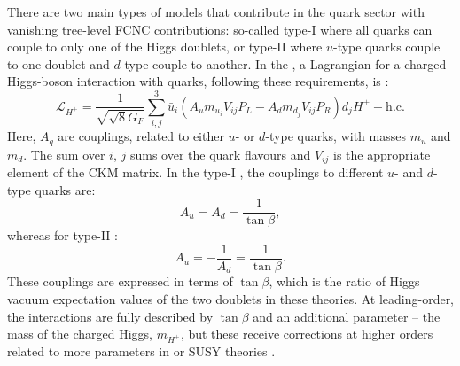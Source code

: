 There are two main types of \TwoHDM models that contribute in the quark sector with vanishing tree-level FCNC contributions:
so-called type-I \TwoHDM where all quarks can couple to only one of the Higgs doublets, or
type-II \TwoHDM where $u$-type quarks couple to one doublet and $d$-type couple to another.
In the \SM, a Lagrangian for a charged Higgs-boson interaction with quarks, following these requirements, is \cite{Hermann:2012fc}:
\begin{equation}
    \mathcal{L}_{H^+} = \frac{1}{\sqrt{\sqrt8G_F}} \sum_{i,j}^3 \bar{u}_i (A_u m_{u_i}V_{ij}P_L - A_d m_{d_j}V_{ij}P_R)d_jH^+ + \mathrm{h.c}.
\end{equation}
Here, $A_q$ are couplings, related to either $u$- or $d$-type quarks, with masses $m_u$ and $m_d$.
The sum over $i$, $j$ sums over the quark flavours and $V_{ij}$ is the appropriate element of the CKM matrix.
In the type-I \TwoHDM, the couplings to different $u$- and $d$-type quarks are:
\begin{equation}\label{eq:type1_hdm_couplings}
A_u = A_d = \frac{1}{\tan\beta},
\end{equation}
whereas for type-II \TwoHDM:
\begin{equation}\label{eq:type2_hdm_couplings}
    A_u = - \frac{1}{A_d} = \frac{1}{\tan\beta}.
\end{equation}
These couplings are expressed in terms of $\tan\beta$, which is the ratio of Higgs vacuum expectation values of the two doublets in these theories.
At leading-order, the interactions are fully described by $\tan\beta$ and an additional parameter -- the mass of the charged Higgs, $m_{H^+}$, but these receive corrections at higher orders related to more parameters in \TwoHDM or SUSY theories \cite{Feng:1996xv}.

